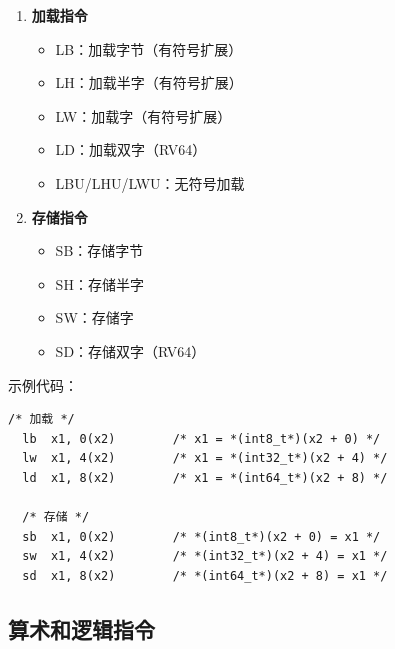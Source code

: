 
\begin{enumerate}
  \item \textbf{加载指令}
    \begin{itemize}
      \item LB：加载字节（有符号扩展）
      \item LH：加载半字（有符号扩展）
      \item LW：加载字（有符号扩展）
      \item LD：加载双字（RV64）
      \item LBU/LHU/LWU：无符号加载
    \end{itemize}

  \item \textbf{存储指令}
    \begin{itemize}
      \item SB：存储字节
      \item SH：存储半字
      \item SW：存储字
      \item SD：存储双字（RV64）
    \end{itemize}
\end{enumerate}

示例代码：
\begin{lstlisting}[language={[RISC-V]Assembler}]
  /* 加载 */
  lb  x1, 0(x2)        /* x1 = *(int8_t*)(x2 + 0) */
  lw  x1, 4(x2)        /* x1 = *(int32_t*)(x2 + 4) */
  ld  x1, 8(x2)        /* x1 = *(int64_t*)(x2 + 8) */

  /* 存储 */
  sb  x1, 0(x2)        /* *(int8_t*)(x2 + 0) = x1 */
  sw  x1, 4(x2)        /* *(int32_t*)(x2 + 4) = x1 */
  sd  x1, 8(x2)        /* *(int64_t*)(x2 + 8) = x1 */
\end{lstlisting}

\subsection{算术和逻辑指令}


